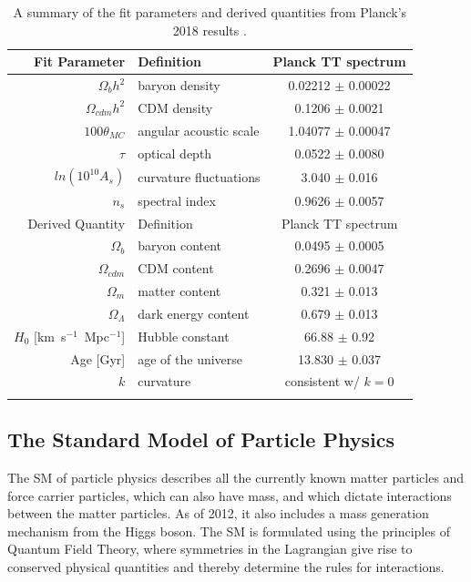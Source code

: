 \begin{table}[htbp]

\caption{A summary of the fit parameters and derived quantities from Planck's 2018 results \cite{Planck2018}.}
\begin{center}
\begin{tabular}{ r l c }
\hline
Fit Parameter & Definition &  Planck TT spectrum \\
\hline
$\Omega_{b}h^{2}$ & baryon density & 0.02212 $\pm$ 0.00022 \\
$\Omega_{cdm}h^{2}$ & CDM density & 0.1206 $\pm$ 0.0021 \\
$100\theta_{MC}$ & angular acoustic scale & 1.04077 $\pm$ 0.00047 \\
$\tau$ & optical depth & 0.0522 $\pm$ 0.0080 \\
$ln(10^{10}A_{s})$ & curvature fluctuations & 3.040 $\pm$ 0.016 \\
$n_{s}$ & spectral index & 0.9626 $\pm$ 0.0057 \\
\hline
Derived Quantity & Definition &  Planck TT spectrum \\
\hline
$\Omega_{b}$ & baryon content & 0.0495 $\pm$ 0.0005 \\
$\Omega_{cdm}$ & CDM content & 0.2696 $\pm$ 0.0047 \\
$\Omega_{m}$  & matter content & 0.321 $\pm$ 0.013 \\
$\Omega_{\Lambda}$  & dark energy content & 0.679 $\pm$ 0.013 \\
$H_{0}$ [km~s$^{-1}$~Mpc$^{-1}$] & Hubble constant & 66.88 $\pm$ 0.92 \\
Age [Gyr]  & age of the universe & 13.830 $\pm$  0.037 \\
$k$ & curvature & consistent w/ $k=0$ \\
\label{tb:planck}
\end{tabular}
\end{center}
\label{default}
\end{table}%



\subsection{The Standard Model of Particle Physics}
The \ac{SM} of particle physics describes all the currently known matter particles and force carrier particles, which can also have mass, and which dictate interactions between the matter particles. As of 2012, it also includes a mass generation mechanism from the Higgs boson. The \ac{SM} is formulated using the principles of Quantum Field Theory, where symmetries in the Lagrangian give rise to conserved physical quantities and thereby determine the rules for interactions.

